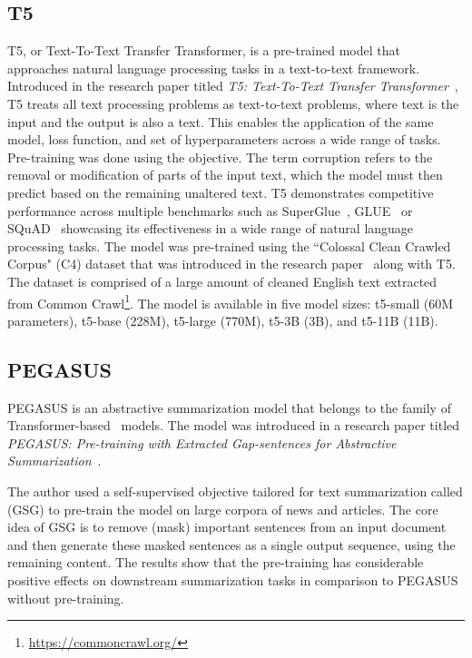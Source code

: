 \documentclass[english, ba, kiv, he, iso690numb, pdf, viewonly]{fasthesis}
\begin{document}
\subsection{T5} \label{subsec:T5}
T5, or Text-To-Text Transfer Transformer, is a pre-trained model that approaches natural language processing tasks in a text-to-text framework. Introduced in the research paper titled \textit{T5: Text-To-Text Transfer Transformer}~\cite{2020t5}, T5 treats all text processing problems as text-to-text problems, where text is the input and the output is also a text. This enables the application of the same model, loss function, and set of hyperparameters across a wide range of tasks. Pre-training was done using the  objective. The term corruption refers to the removal or modification of parts of the input text, which the model must then predict based on the remaining unaltered text. T5 demonstrates competitive performance across multiple benchmarks such as SuperGlue~\cite{wang2020superglue}, GLUE~\cite{wang-etal-2018-glue} or SQuAD~\cite{rajpurkar2016squad} showcasing its effectiveness in a wide range of natural language processing tasks. The model was pre-trained using the “Colossal Clean Crawled Corpus" (C4) dataset that was introduced in the research paper~\cite{2020t5} along with T5. The dataset is comprised of a large amount of cleaned English text extracted from Common Crawl\footnote{\url{https://commoncrawl.org/}}. 
The model is available in five model sizes: t5-small (60M parameters), t5-base (228M), t5-large (770M), t5-3B (3B), and t5-11B (11B).
\subsection{PEGASUS}\label{subsec:pegasus}
PEGASUS is an abstractive summarization model that belongs to the family of Transformer-based~\cite{vaswani2023attention} models. The model was introduced in a research paper titled \textit{PEGASUS: Pre-training with Extracted Gap-sentences for Abstractive Summarization}~\cite{zhang2019pegasus}. 

The author used a self-supervised objective tailored for text summarization called  (GSG) to pre-train the model on large corpora of news and articles. The core idea of GSG is to remove (mask) important sentences from an input document and then generate these masked sentences as a single output sequence, using the remaining content. The results show that the pre-training has considerable positive effects on downstream summarization tasks in comparison to PEGASUS without pre-training. 
\end{document}
